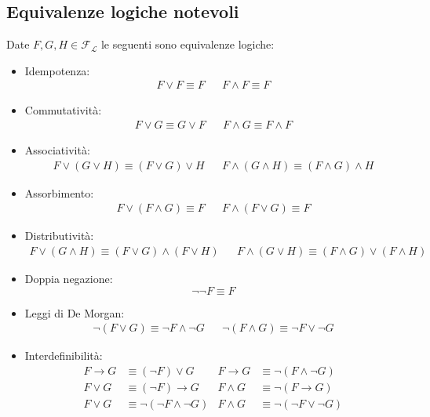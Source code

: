 \subsection{Equivalenze logiche notevoli}
Date $F, G, H \in \mathscr{F_L}$ le seguenti sono equivalenze logiche:
\begin{itemize}
  \item Idempotenza:
    \begin{align*}
      F \lor F \equiv F &&
      F \land F \equiv F
    \end{align*}
    
  \item Commutatività:
    \begin{align*}
      F \lor G \equiv G \lor F &&
      F \land G \equiv F \land F 
    \end{align*}
    
  \item Associatività:
    \begin{align*}
      F \lor (G \lor H) \equiv (F \lor G) \lor H &&
      F \land (G \land H) \equiv (F \land G) \land H
    \end{align*}
    
  \item Assorbimento:
    \label{assorbimento}
    \begin{align*}
      F \lor (F \land G) \equiv F &&
      F \land (F\lor G) \equiv F 
    \end{align*}

  \item Distributività:
    \begin{align*}
      F \lor (G \land H) \equiv (F \lor G) \land (F \lor H) &&
      F \land (G \lor H) \equiv (F \land G) \lor (F \land H)
    \end{align*}

  \item Doppia negazione:
    $$
    \neg\neg F \equiv F
    $$

  \item Leggi di De Morgan:
    \begin{align*}
      \neg (F \lor G) \equiv \neg F \land \neg G &&
      \neg (F \land G) \equiv \neg F \lor \neg G 
    \end{align*}

  \item Interdefinibilità:
    \begin{align*}
      F \rightarrow G &\equiv  (\neg F) \lor G &
      F \rightarrow G &\equiv \neg(F \land \neg G) \\
      F \lor G &\equiv (\neg F) \rightarrow G &
      F \land G &\equiv \neg(F \rightarrow G) \\
      F \lor G &\equiv \neg (\neg F \land \neg G) &
      F \land G &\equiv \neg(\neg F \lor \neg G)
    \end{align*}
    

\end{itemize}
